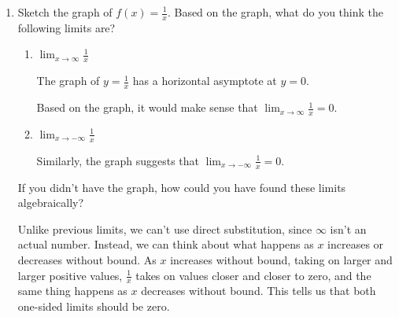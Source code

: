 \documentclass{article}
\begin{document}
\begin{enumerate}
\item  

  Sketch the graph of $f(x) = \frac{1}{x}$. Based on the graph, what do you think the following limits are? 

  \begin{enumerate}
  \item
    \begin{problem}
      $\displaystyle \lim_{x \to \infty} \frac{1}{x}$
    \end{problem}

    \begin{solution}
      The graph of $y=\frac{1}{x}$ has a horizontal asymptote at $y=0$.


      Based on the graph, it would make sense that $\displaystyle \lim_{x \to \infty} \frac{1}{x}=0$.
    \end{solution}

  \item
    \begin{problem}[\vfill]
      $\displaystyle \lim_{x \to -\infty} \frac{1}{x}$
    \end{problem}

    \begin{solution}
      Similarly, the graph suggests that $\displaystyle \lim_{x \to -\infty} \frac{1}{x}=0$.
    \end{solution}

  \end{enumerate}


  \begin{problem}[\stretch{0.5}]
    If you didn't have the graph, how could you have found these limits algebraically? 
  \end{problem}

  \begin{solution}
    Unlike previous limits, we can't use direct substitution, since $\infty$ isn't an actual number.
    Instead, we can think about what happens as $x$ increases or decreases without bound. As $x$ increases
    without bound, taking on larger and larger positive values, 
    $\frac{1}{x}$ takes on values closer and closer to zero, and the same thing happens as $x$
    decreases without bound. This tells us that both one-sided limits should be zero.
    

\end{solution}
\end{enumerate}
\end{document}
